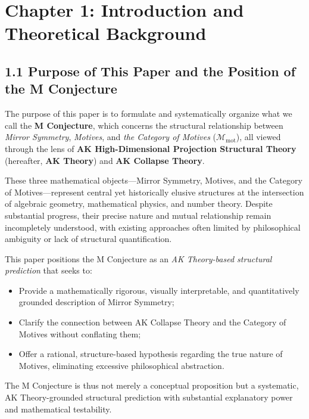 \documentclass[11pt]{article}
\begin{document}

\section{Chapter 1: Introduction and Theoretical Background}

\subsection{1.1 Purpose of This Paper and the Position of the M Conjecture}

The purpose of this paper is to formulate and systematically organize what we call the \textbf{M Conjecture}, which concerns the structural relationship between \textit{Mirror Symmetry}, \textit{Motives}, and \textit{the Category of Motives} ($\mathcal{M}_{\mathrm{mot}}$), all viewed through the lens of \textbf{AK High-Dimensional Projection Structural Theory} (hereafter, \textbf{AK Theory}) and \textbf{AK Collapse Theory}.

These three mathematical objects—Mirror Symmetry, Motives, and the Category of Motives—represent central yet historically elusive structures at the intersection of algebraic geometry, mathematical physics, and number theory. Despite substantial progress, their precise nature and mutual relationship remain incompletely understood, with existing approaches often limited by philosophical ambiguity or lack of structural quantification.

This paper positions the M Conjecture as an \emph{AK Theory-based structural prediction} that seeks to:

\begin{itemize}
    \item Provide a mathematically rigorous, visually interpretable, and quantitatively grounded description of Mirror Symmetry;
    \item Clarify the connection between AK Collapse Theory and the Category of Motives without conflating them;
    \item Offer a rational, structure-based hypothesis regarding the true nature of Motives, eliminating excessive philosophical abstraction.
\end{itemize}

The M Conjecture is thus not merely a conceptual proposition but a systematic, AK Theory-grounded structural prediction with substantial explanatory power and mathematical testability.
\end{document}

